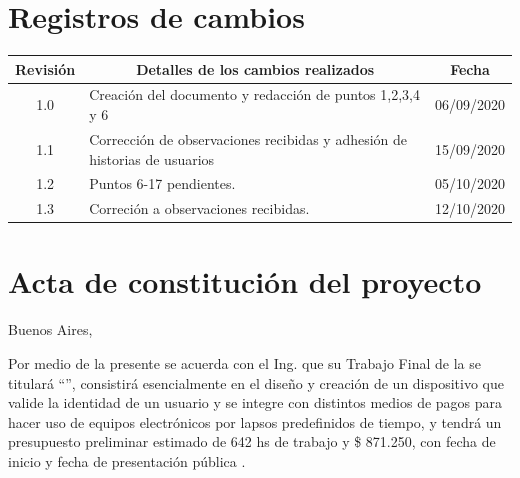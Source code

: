 \documentclass[11pt]{charter}
\begin{document}
\maketitle
\thispagestyle{empty}
\pagebreak


\thispagestyle{empty}
{\setlength{\parskip}{0pt}
\tableofcontents{}
}
\pagebreak


\section{Registros de cambios}
\label{sec:registro}


\begin{table}[ht]
\label{tab:registro}
\centering
\begin{tabularx}{\linewidth}{@{}|c|X|c|@{}}
\hline
\rowcolor[HTML]{C0C0C0} 
Revisión & \multicolumn{1}{c|}{\cellcolor[HTML]{C0C0C0}Detalles de los cambios realizados} & Fecha      \\ \hline
1.0      & Creación del documento y redacción de puntos 1,2,3,4 y 6  & 06/09/2020 \\ \hline
1.1      & Corrección de observaciones recibidas y adhesión de historias de usuarios                                                                 & 15/09/2020 \\ \hline
1.2      & Puntos 6-17 pendientes. &05/10/2020 \\ \hline
1.3      & Correción a observaciones recibidas. &12/10/2020 \\ \hline
\end{tabularx}
\end{table}

\pagebreak



\section{Acta de constitución del proyecto}
\label{sec:acta}

\begin{flushright}
Buenos Aires, \fechaInicioName
\end{flushright}

\vspace{2cm}

Por medio de la presente se acuerda con el Ing. \authorname\hspace{1px} que su Trabajo Final de la \degreename\hspace{1px} se titulará ``\ttitle'', consistirá esencialmente en el diseño y creación de un dispositivo que valide la identidad de un usuario y se integre con distintos medios de pagos para hacer uso de equipos electrónicos por lapsos predefinidos de tiempo, y tendrá un presupuesto preliminar estimado de 642 hs de trabajo y \$ 871.250, con fecha de inicio \fechaInicioName\hspace{1px} y fecha de presentación pública \fechaFinalName.
\end{document}
